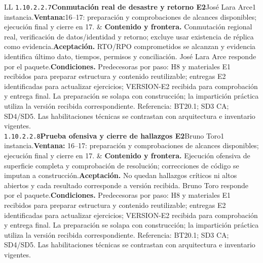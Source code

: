 \begin{longtable}{L{\tabcolsep\relax}L{\tabcolsep\relax}}
\texttt{1.\allowbreak{}10.\allowbreak{}2.\allowbreak{}2.\allowbreak{}7}\newline{}\textbf{Conmutación real de desastre y retorno E2}\newline{}José Lara Arce\newline{}1 instancia.\newline{}\textbf{Ventana:}16--17: preparación y comprobaciones de alcances disponibles; ejecución final y cierre en 17. & \textbf{Contenido y frontera.} Conmutación regional real, verificación de datos/identidad y retorno; excluye usar existencia de réplica como evidencia.\newline{}\textbf{Aceptación.} RTO/RPO comprometidos se alcanzan y evidencia identifica último dato, tiempos, permisos y conciliación. José Lara Arce responde por el paquete.\newline{}\textbf{Condiciones.} Predecesoras por paso: H8 y materiales E1 recibidos para preparar estructura y contenido reutilizable; entregas E2 identificadas para actualizar ejercicios; VERSION-E2 recibida para comprobación y entrega final. La preparación se solapa con construcción; la impartición práctica utiliza la versión recibida correspondiente. Referencia: BT20.1; SD3 CA; SD4/SD5. Las habilitaciones técnicas se contrastan con arquitectura e inventario vigentes.\\\hline
\texttt{1.\allowbreak{}10.\allowbreak{}2.\allowbreak{}2.\allowbreak{}8}\newline{}\textbf{Prueba ofensiva y cierre de hallazgos E2}\newline{}Bruno Toro\newline{}1 instancia.\newline{}\textbf{Ventana:} 16--17: preparación y comprobaciones de alcances disponibles; ejecución final y cierre en 17. & \textbf{Contenido y frontera.} Ejecución ofensiva de superficie completa y comprobación de resolución; correcciones de código se imputan a construcción.\newline{}\textbf{Aceptación.} No quedan hallazgos críticos ni altos abiertos y cada resultado corresponde a versión recibida. Bruno Toro responde por el paquete.\newline{}\textbf{Condiciones.} Predecesoras por paso: H8 y materiales E1 recibidos para preparar estructura y contenido reutilizable; entregas E2 identificadas para actualizar ejercicios; VERSION-E2 recibida para comprobación y entrega final. La preparación se solapa con construcción; la impartición práctica utiliza la versión recibida correspondiente. Referencia: BT20.1; SD3 CA; SD4/SD5. Las habilitaciones técnicas se contrastan con arquitectura e inventario vigentes.\\\hline

\end{longtable}
